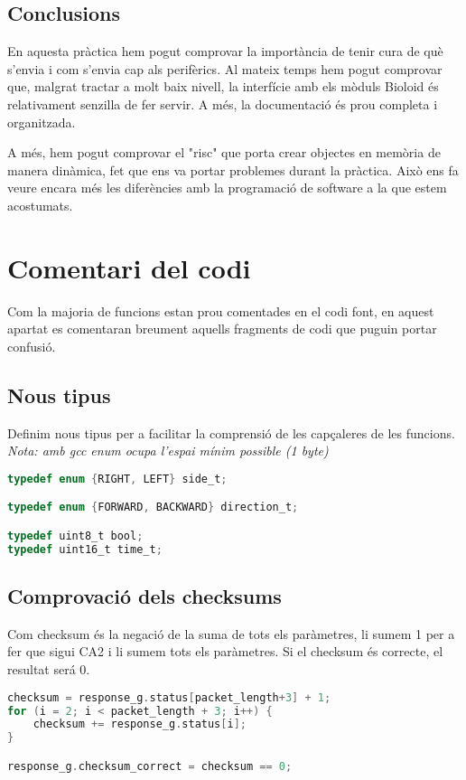\documentclass{../pdae} %
\begin{document}
\subsection{Conclusions}

En aquesta pràctica hem pogut comprovar la importància de tenir cura de què
s'envia i com s'envia cap als perifèrics. Al mateix temps hem pogut comprovar
que, malgrat tractar a molt baix nivell, la interfície amb els mòduls Bioloid
és relativament senzilla de fer servir. A més, la documentació és prou completa
i organitzada.\par
A més, hem pogut comprovar el "risc" que porta crear objectes en memòria de
manera dinàmica, fet que ens va portar problemes durant la pràctica.
Això ens fa veure encara més les diferències amb la programació de software a
la que estem acostumats.


\section{Comentari del codi}

Com la majoria de funcions estan prou comentades en el codi font, en aquest apartat es comentaran breument aquells fragments de codi que puguin portar confusió.

\subsection{Nous tipus}
Definim nous tipus per a facilitar la comprensió de les capçaleres de les funcions. \textit{Nota: amb gcc enum ocupa l'espai mínim possible (1 byte)}

\begin{lstlisting}[language=C]
typedef enum {RIGHT, LEFT} side_t;

typedef enum {FORWARD, BACKWARD} direction_t;

typedef uint8_t bool;
typedef uint16_t time_t;
\end{lstlisting}

\subsection{Comprovació dels checksums}

Com checksum és la negació de la suma de tots els paràmetres, li sumem 1 per a fer que sigui CA2 i li sumem tots els paràmetres. Si el checksum és correcte, el resultat será 0.
\begin{lstlisting}[language=C]
checksum = response_g.status[packet_length+3] + 1;
for (i = 2; i < packet_length + 3; i++) {
    checksum += response_g.status[i];
}

response_g.checksum_correct = checksum == 0;
\end{lstlisting}
\end{document}
